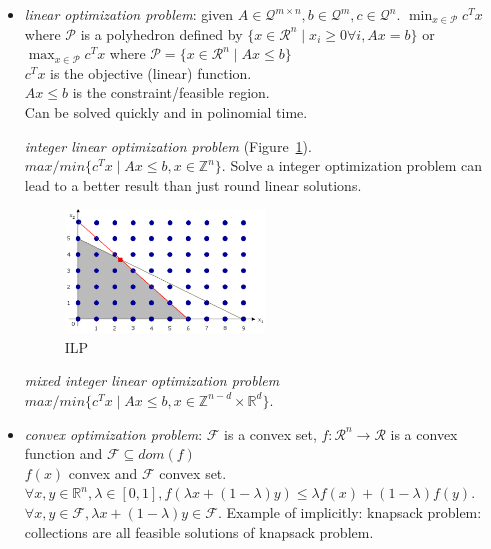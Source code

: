 \documentclass[main]{subfiles}
\begin{document}
\begin{itemize}
\item \emph{linear optimization problem}: given $A \in \mathcal{Q}^{m \times
n}, b \in
\mathcal{Q}^{m}, c \in \mathcal{Q}^{n}$. $\displaystyle \min_{x \in
\mathcal{P}} c^{T}x$ where $\mathcal{P}$ is a polyhedron defined by $\{ x \in
\mathcal{R}^{n} \mid x_{i} \geq 0 \forall i, Ax = b \}$ or $\displaystyle
\max_{x \in \mathcal{P}} c^{T}x$ where $\mathcal{P} = \{ x \in
\mathcal{R}^{n} \mid Ax \leq b \}$ \\
$c^{T}x$ is the objective (linear) function. \\
$Ax \leq b$ is the constraint/feasible region.\\
Can be solved quickly and in polinomial time.

\subitem \emph{integer linear optimization problem} (Figure~\ref{fig:ILP}).
$max/min \{ c^{T}x \mid Ax \leq b, x \in \mathbb{Z}^{n} \}$.
Solve a integer optimization problem can lead to a better result than just
round linear solutions.

\begin{figure}
  \label{fig:ILP}
  \caption{ILP}
  \centering
    \includegraphics[width=0.5\textwidth]{imgs/ILP.png}
\end{figure}

\subitem \emph{mixed integer linear optimization problem}
$max/min \{ c^{T}x \mid Ax \leq b, x \in \mathbb{Z}^{n-d} \times
\mathbb{R}^{d} \}$.

\item \emph{convex optimization problem}: $\mathcal{F}$ is a convex set, $f:
\mathcal{R}^{n} \rightarrow \mathcal{R}$ is a convex function and $\mathcal{F}
\subseteq dom(f)$\\
$f(x)$ convex and $\mathcal{F}$ convex set. $\forall x, y \in \mathbb{R}^{n},
\lambda \in [0,1], f(\lambda x + (1-\lambda)y) \leq \lambda f(x) + (1-\lambda)
f(y)$. $\forall x,y \in \mathcal{F}, \lambda x + (1-\lambda)y \in \mathcal{F}$.
\subitem Example of implicitly: knapsack problem: collections are all feasible
solutions of knapsack problem.


\end{itemize}
\end{document}
